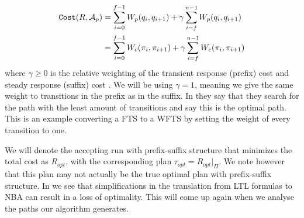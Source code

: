 \begin{align*}
\texttt{Cost} (R, \mathcal{A}_p) &= \sum_{i=0}^{f-1} W_p(q_i,q_{i+1}) + \gamma \sum_{i=f}^{n-1} W_p(q_i,q_{i+1}) \\
&= \sum_{i=0}^{f-1} W_c(\pi_i,\pi_{i+1}) + \gamma \sum_{i=f}^{n-1} W_c(\pi_i, \pi_{i+1})
\end{align*}
where $\gamma \geq 0$ is the relative weighting of the transient response (prefix) cost and steady response (suffix) cost \cite{guo15}. We will be using $\gamma = 1$, meaning we give the same weight to transitions in the prefix as in the suffix. In \cite{fainekos09} they say that they search for the path with the least amount of transitions and say this is the optimal path. This is an example converting a FTS to a WFTS by setting the weight of every transition to one.
 


We will denote the accepting run with prefix-suffix structure that minimizes the total cost as $R_{opt}$, with the corresponding plan $\tau_{opt} = R_{opt}|_\Pi$. We note however that this plan may not actually be the true optimal plan with prefix-suffix structure. In \cite{schuppan05} we see that simplifications in the translation from LTL formulas to NBA can result in a loss of optimality. This will come up again when we analyse the paths our algorithm generates. 